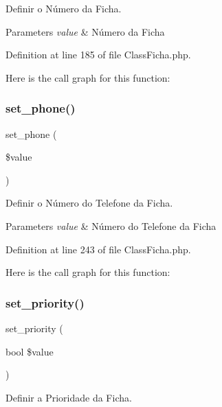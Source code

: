 Definir o Número da Ficha. 


\begin{DoxyParams}{Parameters}
{\em value} & Número da Ficha \\
\hline
\end{DoxyParams}


Definition at line 185 of file Class\+Ficha.\+php.

Here is the call graph for this function\+:
\mbox{\label{class_class_ficha_a62e5af292b272f5b6ffd4606bafe7104}} 
\subsubsection{\texorpdfstring{set\+\_\+phone()}{set\_phone()}}
{\footnotesize\ttfamily set\+\_\+phone (\begin{DoxyParamCaption}\item[{}]{\$value }\end{DoxyParamCaption})}



Definir o Número do Telefone da Ficha. 


\begin{DoxyParams}{Parameters}
{\em value} & Número do Telefone da Ficha \\
\hline
\end{DoxyParams}


Definition at line 243 of file Class\+Ficha.\+php.

Here is the call graph for this function\+:
\mbox{\label{class_class_ficha_ab92929a73f7f8e23561ad86f989a6c80}} 
\subsubsection{\texorpdfstring{set\+\_\+priority()}{set\_priority()}}
{\footnotesize\ttfamily set\+\_\+priority (\begin{DoxyParamCaption}\item[{bool}]{\$value }\end{DoxyParamCaption})}



Definir a Prioridade da Ficha. 



